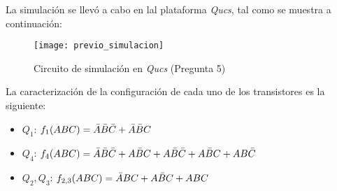 \documentclass[../procedimientos.tex]{subfiles}
\begin{document}
\begin{table}[H]
  \centering
  \caption{Voltajes de la simulación (Pregunta 5)}
\end{table}

La simulación se llevó a cabo en lal plataforma \textit{Qucs}, tal como se 
muestra a continuación:
\begin{figure}[H]
  \centering
  \texttt{[image: previo\_simulacion]}
  \caption{Circuito de simulación en \textit{Qucs} (Pregunta 5)}
\end{figure}

La caracterización de la configuración de cada uno de los transistores es la 
siguiente:
\begin{itemize}
  \item $Q_1$: $f_1(ABC) = \bar{A}\bar{B}\bar{C} + \bar{A}\bar{B}C$
  \item $Q_4$: $f_4(ABC) = \bar{A}\bar{B}\bar{C} + A\bar{B}C+A\bar{B}\bar{C} + 
    A\bar{B}C + AB\bar{C}$
  \item $Q_2, Q_3$: $f_{2,3}(ABC) = \bar{A}BC + A\bar{B}C + ABC$

\end{itemize}
\end{document}

